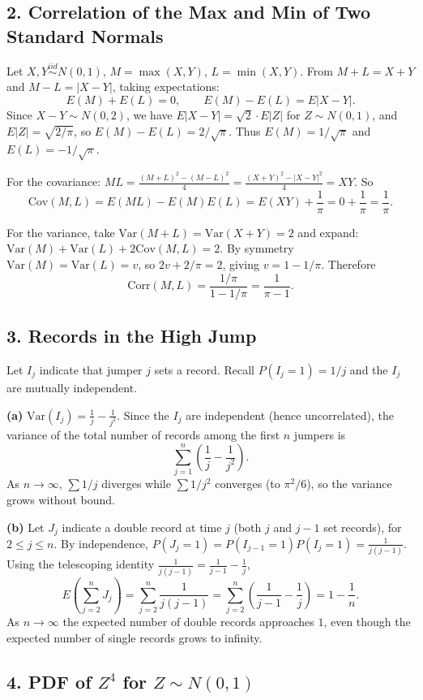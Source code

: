 \documentclass{article}
\begin{document}
\subsection*{2. Correlation of the Max and Min of Two Standard Normals}

Let $X,Y\overset{iid}{\sim}N(0,1)$, $M=\max(X,Y)$, $L=\min(X,Y)$. From $M+L=X+Y$ and $M-L=|X-Y|$, taking expectations:
$$
E(M)+E(L)=0, \qquad E(M)-E(L)=E|X-Y|.
$$
Since $X-Y\sim N(0,2)$, we have $E|X-Y|=\sqrt{2}\cdot E|Z|$ for $Z\sim N(0,1)$, and $E|Z|=\sqrt{2/\pi}$, so $E(M)-E(L)=2/\sqrt{\pi}$. Thus $E(M)=1/\sqrt{\pi}$ and $E(L)=-1/\sqrt{\pi}$.

For the covariance: $ML = \frac{(M+L)^2-(M-L)^2}{4} = \frac{(X+Y)^2-|X-Y|^2}{4} = XY$. So
$$
\text{Cov}(M,L) = E(ML)-E(M)E(L) = E(XY)+\frac{1}{\pi} = 0+\frac{1}{\pi} = \frac{1}{\pi}.
$$

For the variance, take $\text{Var}(M+L)=\text{Var}(X+Y)=2$ and expand: $\text{Var}(M)+\text{Var}(L)+2\text{Cov}(M,L)=2$. By symmetry $\text{Var}(M)=\text{Var}(L)=v$, so $2v+2/\pi=2$, giving $v=1-1/\pi$. Therefore
$$
\text{Corr}(M,L) = \frac{1/\pi}{1-1/\pi} = \frac{1}{\pi-1}.
$$

\subsection*{3. Records in the High Jump}

Let $I_j$ indicate that jumper $j$ sets a record. Recall $P(I_j=1)=1/j$ and the $I_j$ are mutually independent.

\textbf{(a)} $\text{Var}(I_j)=\frac{1}{j}-\frac{1}{j^2}$. Since the $I_j$ are independent (hence uncorrelated), the variance of the total number of records among the first $n$ jumpers is
$$
\sum_{j=1}^n\left(\frac{1}{j}-\frac{1}{j^2}\right).
$$
As $n\to\infty$, $\sum 1/j$ diverges while $\sum 1/j^2$ converges (to $\pi^2/6$), so the variance grows without bound.

\textbf{(b)} Let $J_j$ indicate a double record at time $j$ (both $j$ and $j-1$ set records), for $2\le j\le n$. By independence, $P(J_j=1)=P(I_{j-1}=1)P(I_j=1)=\frac{1}{j(j-1)}$. Using the telescoping identity $\frac{1}{j(j-1)}=\frac{1}{j-1}-\frac{1}{j}$,
$$
E\!\left(\sum_{j=2}^n J_j\right)=\sum_{j=2}^n\frac{1}{j(j-1)}=\sum_{j=2}^n\left(\frac{1}{j-1}-\frac{1}{j}\right)=1-\frac{1}{n}.
$$
As $n\to\infty$ the expected number of double records approaches $1$, even though the expected number of single records grows to infinity.

\subsection*{4. PDF of $Z^4$ for $Z\sim N(0,1)$}
\end{document}
